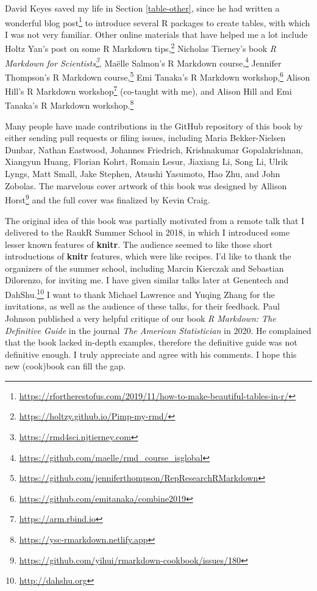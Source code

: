 \documentclass[
  11pt,
]{krantz}
\renewcommand{\href}[2]{#2\footnote{\url{#1}}}
\begin{document}
David Keyes saved my life in Section \ref{table-other}, since he had written \href{https://rfortherestofus.com/2019/11/how-to-make-beautiful-tables-in-r/}{a wonderful blog post} to introduce several R packages to create tables, with which I was not very familiar. Other online materials that have helped me a lot include Holtz Yan's \href{https://holtzy.github.io/Pimp-my-rmd/}{post on some R Markdown tips,} Nicholas Tierney's book \emph{\href{https://rmd4sci.njtierney.com}{R Markdown for Scientists}}, Maëlle Salmon's \href{https://github.com/maelle/rmd_course_isglobal}{R Markdown course,} Jennifer Thompson's \href{https://github.com/jenniferthompson/RepResearchRMarkdown}{R Markdown course,} Emi Tanaka's \href{https://github.com/emitanaka/combine2019}{R Markdown workshop,} Alison Hill's \href{https://arm.rbind.io}{R Markdown workshop} (co-taught with me), and Alison Hill and Emi Tanaka's \href{https://ysc-rmarkdown.netlify.app}{R Markdown workshop.}

Many people have made contributions in the GitHub repository of this book by either sending pull requests or filing issues, including Maria Bekker-Nielsen Dunbar, Nathan Eastwood, Johannes Friedrich, Krishnakumar Gopalakrishnan, Xiangyun Huang, Florian Kohrt, Romain Lesur, Jiaxiang Li, Song Li, Ulrik Lyngs, Matt Small, Jake Stephen, Atsushi Yasumoto, Hao Zhu, and John Zobolas. The marvelous cover artwork of this book \href{https://github.com/yihui/rmarkdown-cookbook/issues/180}{was designed by Allison Horst} and the full cover was finalized by Kevin Craig.

The original idea of this book was partially motivated from a remote talk that I delivered to the RaukR Summer School in 2018, in which I introduced some lesser known features of \textbf{knitr}. The audience seemed to like those short introductions of \textbf{knitr} features, which were like recipes. I'd like to thank the organizers of the summer school, including Marcin Kierczak and Sebastian Dilorenzo, for inviting me. I have given similar talks later at Genentech and \href{http://dahshu.org}{DahShu.} I want to thank Michael Lawrence and Yuqing Zhang for the invitations, as well as the audience of these talks, for their feedback. Paul Johnson published a very helpful critique of our book \emph{R Markdown: The Definitive Guide} in the journal \emph{The American Statistician} in 2020. He complained that the book lacked in-depth examples, therefore the definitive guide was not definitive enough. I truly appreciate and agree with his comments. I hope this new (cook)book can fill the gap.
\end{document}
